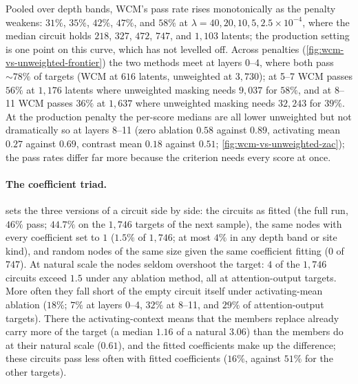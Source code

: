 \documentclass[10pt]{article}
\begin{document}
Pooled over depth bands, WCM's pass rate rises monotonically as the penalty weakens: $31\%$, $35\%$, $42\%$, $47\%$, and $58\%$ at $\lambda = 40, 20, 10, 5, 2.5 \times 10^{-4}$, where the median circuit holds $218$, $327$, $472$, $747$, and $1{,}103$ latents; the production setting is one point on this curve, which has not levelled off.
Across penalties (\cref{fig:wcm-vs-unweighted-frontier}) the two methods meet at layers 0--4, where both pass ${\sim}78\%$ of targets (WCM at $616$ latents, unweighted at $3{,}730$); at 5--7 WCM passes $56\%$ at $1{,}176$ latents where unweighted masking needs $9{,}037$ for $58\%$, and at 8--11 WCM passes $36\%$ at $1{,}637$ where unweighted masking needs $32{,}243$ for $39\%$.
At the production penalty the per-score medians are all lower unweighted but not dramatically so at layers 8--11 (zero ablation $0.58$ against $0.89$, activating mean $0.27$ against $0.69$, contrast mean $0.18$ against $0.51$; \cref{fig:wcm-vs-unweighted-zac}); the pass rates differ far more because the criterion needs every score at once.

\paragraph{The coefficient triad.}
 sets the three versions of a circuit side by side: the circuits as fitted (the full run, $46\%$ pass; $44.7\%$ on the $1{,}746$ targets of the next sample), the same nodes with every coefficient set to $1$ ($1.5\%$ of $1{,}746$; at most $4\%$ in any depth band or site kind), and random nodes of the same size given the same coefficient fitting ($0$ of $747$).
At natural scale the nodes seldom overshoot the target: $4$ of the $1{,}746$ circuits exceed $1.5$ under any ablation method, all at attention-output targets.
More often they fall short of the empty circuit itself under activating-mean ablation ($18\%$; $7\%$ at layers 0--4, $32\%$ at 8--11, and $29\%$ of attention-output targets).
There the activating-context means that the members replace already carry more of the target (a median $1.16$ of a natural $3.06$) than the members do at their natural scale ($0.61$), and the fitted coefficients make up the difference; these circuits pass less often with fitted coefficients ($16\%$, against $51\%$ for the other targets).
\end{document}
